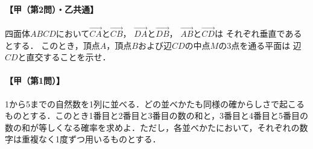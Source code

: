 \documentclass[../../main.tex]{subfiles}
\begin{document}
\paragraph{【甲（第2問）・乙共通】}
四面体$ABCD$において$\overrightarrow{CA}$と$\overrightarrow{CB}$，
$\overrightarrow{DA}$と$\overrightarrow{DB}$，
$\overrightarrow{AB}$と$\overrightarrow{CD}$は
それぞれ垂直であるとする．
このとき，頂点$A$，頂点$B$および辺$CD$の中点$M$の3点を通る平面は
辺$CD$と直交することを示せ．

\paragraph{【甲（第1問）】}
1から5までの自然数を1列に並べる．どの並べかたも同様の確からしさで起こるものとする．このとき1番目と2番目と3番目の数の和と，3番目と4番目と5番目の数の和が等しくなる確率を求めよ．ただし，各並べかたにおいて，それぞれの数字は重複なく1度ずつ用いるものとする．
\end{document}

